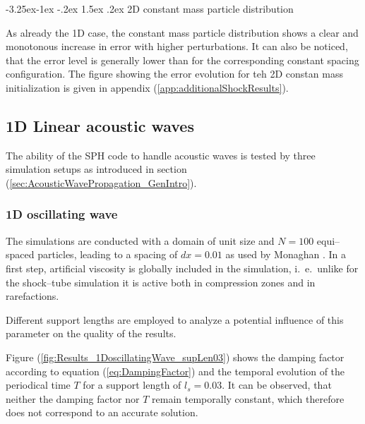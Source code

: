 \documentclass[11pt,a4paper,twoside]{report}
\makeatletter
\renewcommand\paragraph{\@startsection{paragraph}{4}{\z@}%
  {-3.25ex\@plus -1ex \@minus -.2ex}%
  {1.5ex \@plus .2ex}%
  {\normalfont\normalsize\bfseries}}
\makeatother
\begin{document}
\paragraph{2D constant mass particle distribution}

As already the 1D case, the constant mass particle distribution shows a clear and monotonous increase in error with higher perturbations. It can also be noticed, that the error level is generally lower than for the corresponding constant spacing configuration. The figure showing the error evolution for teh 2D constan mass initialization is given in appendix (\ref{app:additionalShockResults}).






\subsection{1D Linear acoustic waves}
\label{sec:Results_1DLinearAcousticWaves}
The ability of the SPH code to handle acoustic waves is tested by three simulation setups as introduced in section (\ref{sec:AcousticWavePropagation_GenIntro}). 



\subsubsection{1D oscillating wave}
\label{sec:Results_1DoscillatingWave}
The simulations are conducted with a domain of unit size and $N=100$ equi--spaced particles, leading to a spacing of $dx=0.01$ as used by Monaghan \cite{Monaghan2005}.
In a first step, artificial viscosity is globally included in the simulation, i.\ e.\ unlike for the shock--tube simulation it is active both in compression zones and in rarefactions. 

Different support lengths are employed to analyze a potential influence of this parameter on the quality of the results.

 Figure (\ref{fig:Results_1DoscillatingWave_supLen03}) shows the damping factor according to equation (\ref{eq:DampingFactor}) and the temporal evolution of the periodical time $T$ for a support length of $l_s=0.03$. It can be observed, that neither the damping factor nor $T$ remain temporally constant, which therefore does not correspond to an accurate solution.  
\end{document}
